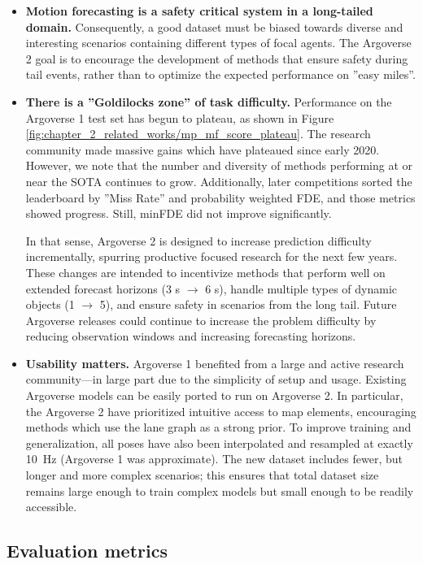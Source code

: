 \begin{itemize}
	\item \textbf{Motion forecasting is a safety critical system in a long-tailed domain.}  Consequently, a good dataset must be biased towards diverse and interesting scenarios containing different types of focal agents. The Argoverse 2 goal is to encourage the development of methods that ensure safety during tail events, rather than to optimize the expected performance on ''easy miles''.
	\item \textbf{There is a ''Goldilocks zone'' of task difficulty.}  Performance on the Argoverse 1 test set has begun to plateau, as shown in Figure \ref{fig:chapter_2_related_works/mp_mf_score_plateau}. The research community made massive gains which have plateaued since early 2020.  However, we note that the number and diversity of methods performing at or near the SOTA continues to grow. Additionally, later competitions sorted the leaderboard by ''Miss Rate'' and probability weighted FDE, and those metrics showed progress. Still, minFDE did not improve significantly.
	
	In that sense, Argoverse 2 is designed to increase prediction difficulty incrementally, spurring productive focused research for the next few years. These changes are intended to incentivize methods that perform well on extended forecast horizons (3 s $\rightarrow$ 6 s), handle multiple types of dynamic objects (1 $\rightarrow$ 5), and ensure safety in scenarios from the long tail. Future Argoverse releases could continue to increase the problem difficulty by reducing observation windows and increasing forecasting horizons.
	\item \textbf{Usability matters.} Argoverse 1 benefited from a large and active research community---in large part due to the simplicity of setup and usage. Existing Argoverse models can be easily ported to run on Argoverse 2.  In particular, the Argoverse 2 have prioritized intuitive access to map elements,  encouraging methods which use the lane graph as a strong prior. To improve training and generalization, all poses have also been interpolated and resampled at exactly \SI{10}{\hertz} (Argoverse 1 was approximate). The new dataset includes fewer, but longer and more complex scenarios; this ensures that total dataset size remains large enough to train complex models but small enough to be readily accessible.
\end{itemize}

\subsection{Evaluation metrics}
\label{subsec:2_evaluation_metrics}

